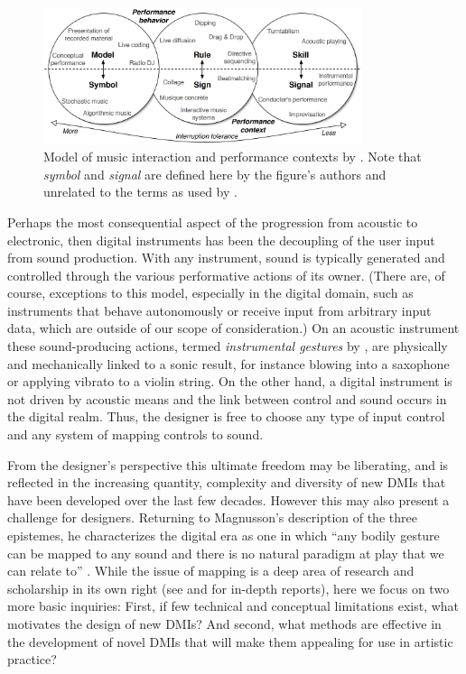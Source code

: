 \documentclass[letterpaper, 12pt]{article}
\begin{document}
\begin{figure}[htpb]
    \centering
    \includegraphics[width=0.83\textwidth]{ch3_malloch_model_of_interaction.jpg}
    \caption[Model of music interaction and performance contexts]{Model of music interaction and performance contexts by \citet{Malloch2006}. Note that \emph{symbol} and \emph{signal} are defined here by the figure's authors and unrelated to the terms as used by \citet{Magnusson2019}.}
    \label{ch3-fig:malloch-model-of-interaction}
\end{figure}

Perhaps the most consequential aspect of the progression from acoustic to electronic, then digital instruments has been the decoupling of the user input from sound production. With any instrument, sound is typically generated and controlled through the various performative actions of its owner. (There are, of course, exceptions to this model, especially in the digital domain, such as instruments that behave autonomously or receive input from arbitrary input data, which are outside of our scope of consideration.) On an acoustic instrument these sound-producing actions, termed \emph{instrumental gestures} by \citet{Cadoz1988}, are physically and mechanically linked to a sonic result, for instance blowing into a saxophone or applying vibrato to a violin string. On the other hand, a digital instrument is not driven by acoustic means and the link between control and sound occurs in the digital realm. Thus, the designer is free to choose any type of input control and any system of mapping controls to sound.

From the designer's perspective this ultimate freedom may be liberating, and is reflected in the increasing quantity, complexity and diversity of new DMIs that have been developed over the last few decades. However this may also present a challenge for designers. Returning to Magnusson's description of the three epistemes, he characterizes the digital era as one in which ``any bodily gesture can be mapped to any sound and there is no natural paradigm at play that we can relate to'' \citep*[p. 34]{Magnusson2019}. While the issue of mapping is a deep area of research and scholarship in its own right (see \citet{os-mapping-2002} and \citet{cmj-mapping-2014} for in-depth reports), here we focus on two more basic inquiries: First, if few technical and conceptual limitations exist, what motivates the design of new DMIs? And second, what methods are effective in the development of novel DMIs that will make them appealing for use in artistic practice?
\end{document}
